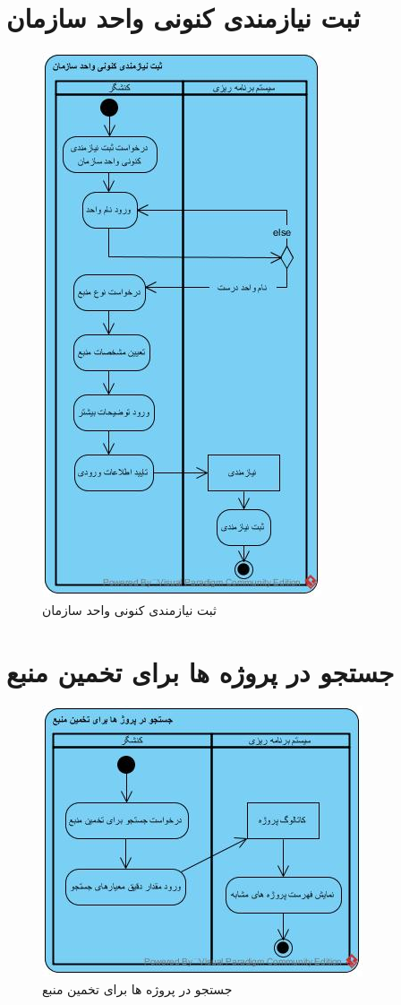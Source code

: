 \section{ثبت نیازمندی کنونی واحد سازمان}
\begin{figure}[H]
	\centering
	\includegraphics[scale=0.8]{img/activity/AddRequirementToUnit}
	\caption{ثبت نیازمندی کنونی واحد سازمان}
\end{figure}

\section{جستجو در پروژه ها برای تخمین منبع}
\begin{figure}[H]
	\centering
	\includegraphics[scale=1]{img/activity/SearchInProjects}
	\caption{جستجو در پروژه ها برای تخمین منبع}
\end{figure}

